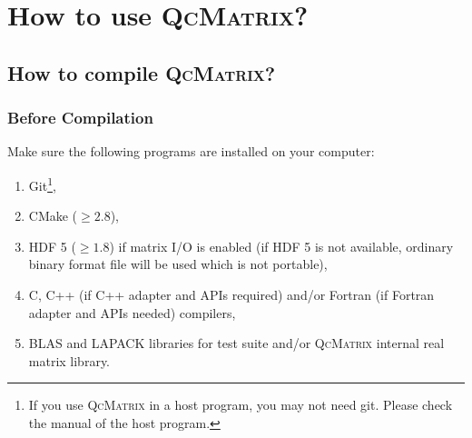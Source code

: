 \documentclass[10pt]{beamer}
\begin{document}
{{\section{How to use \textsc{QcMatrix}?}

\subsection{How to compile \textsc{QcMatrix}?}
\label{section-how-to-compile}

\begin{frame}
  \frametitle<presentation>{Before Compilation}
  Make sure the following programs are installed on your computer:
  \begin{enumerate}
    \item Git\footnote{If you use \textsc{QcMatrix} in a host program,
      you may not need git. Please check the manual of the host program.},
    \item CMake ($\ge2.8$),
    \item HDF 5 ($\ge1.8$) if matrix I/O is enabled (if HDF 5 is not available, ordinary
      binary format file will be used which is not portable),
    \item C, C++ (if C++ adapter and APIs required) and/or Fortran (if Fortran adapter
      and APIs needed) compilers,
    \item BLAS and LAPACK libraries for test suite and/or \textsc{QcMatrix}
      internal real matrix library.
  \end{enumerate}
\end{frame}

}}
\end{document}
